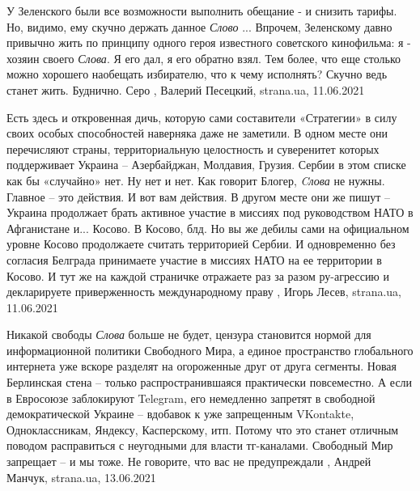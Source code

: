 У Зеленского были все возможности выполнить обещание - и снизить тарифы.  Но,
видимо, ему скучно держать данное \emph{Слово} ...  Впрочем, Зеленскому давно
привычно жить по принципу одного героя известного советского кинофильма: я -
хозяин своего \emph{Слова}. Я его дал, я его обратно взял. Тем более, что еще
столько можно хорошего наобещать избирателю, что к чему исполнять? Скучно ведь
станет жить. Буднично. Серо
, Валерий Песецкий, strana.ua, 11.06.2021

Есть здесь и откровенная дичь, которую сами составители «Стратегии» в силу
своих особых способностей наверняка даже не заметили. В одном месте они
перечисляют страны, территориальную целостность и суверенитет которых
поддерживает Украина – Азербайджан, Молдавия, Грузия. Сербии в этом списке как
бы «случайно» нет. Ну нет и нет. Как говорит Блогер, \emph{Cлова} не нужны.
Главное – это действия.  И вот вам действия. В другом месте они же пишут –
Украина продолжает брать активное участие в миссиях под руководством НАТО в
Афганистане и... Косово. В Косово, блд. Но вы же дебилы сами на официальном
уровне Косово продолжаете считать территорией Сербии. И одновременно без
согласия Белграда принимаете участие в миссиях НАТО на ее территории в Косово.
И тут же на каждой страничке отражаете раз за разом ру-агрессию и декларируете
приверженность международному праву
, Игорь Лесев, strana.ua, 11.06.2021 

Никакой свободы \emph{Слова} больше не будет, цензура становится нормой для
информационной политики Свободного Мира, а единое пространство глобального
интернета уже вскоре разделят на огороженные друг от друга сегменты. Новая
Берлинская стена – только распространившаяся практически повсеместно.  А если в
Евросоюзе заблокируют Telegram, его немедленно запретят в свободной
демократической Украине – вдобавок к уже запрещенным VKontakte, Одноклассникам,
Яндексу, Касперскому, итп. Потому что это станет отличным поводом расправиться
с неугодными для власти тг-каналами. Свободный Мир запрещает – и мы тоже.  Не
говорите, что вас не предупреждали
, Андрей Манчук, strana.ua, 13.06.2021

